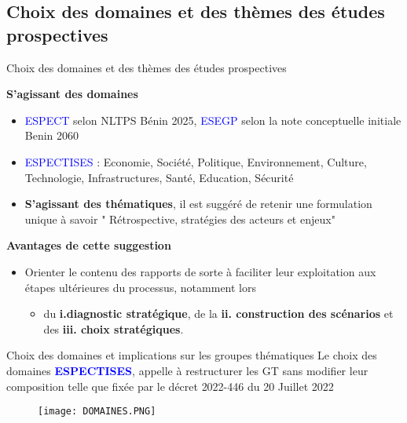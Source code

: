 \documentclass[11pt]{beamer}
\begin{document}
\subsection{\tiny Choix des domaines et des thèmes des études prospectives}
\begin{frame}{Choix des domaines et des thèmes des études prospectives}

\begin{exampleblock}{  \textbf{ S’agissant des domaines } }
\begin{itemize} [<+->]
   \item   \textcolor{blue}{ESPECT} selon NLTPS Bénin 2025, \textcolor{blue}{ESEGP} selon la note conceptuelle initiale Benin 2060  \vfill
   \item    \textcolor{blue}{ESPECTISES} : Economie, Société, Politique, Environnement, Culture, Technologie, Infrastructures, Santé, Education, Sécurité \vfill
   \item \textbf{S’agissant des thématiques}, il est suggéré de retenir une formulation unique à savoir " Rétrospective, stratégies des acteurs et enjeux"
\end{itemize}
\end{exampleblock}
 
\begin{exampleblock}{ \textbf{ Avantages de cette suggestion } }
\begin{itemize} [<+->]
   \item   Orienter le contenu des rapports de sorte à faciliter leur exploitation aux étapes ultérieures du processus, notamment lors \vfill
    \begin{itemize} [<+->]
    \item  \small du \textbf{i.diagnostic stratégique},  de la \textbf{ii. construction des scénarios} et des \textbf{iii. choix stratégiques}.  \vfill
    \end{itemize}
\end{itemize}
\end{exampleblock}
\end{frame}


\begin{frame}{Choix des domaines et implications sur les groupes thématiques}
\small  Le choix des domaines \textcolor{blue}{\textbf{ ESPECTISES}}, appelle à restructurer les GT sans modifier leur composition telle que fixée par le décret 2022-446 du 20 Juillet 2022

\begin{figure}[c]
\texttt{[image: DOMAINES.PNG]}
\end{figure}
\end{frame}
\end{document}
